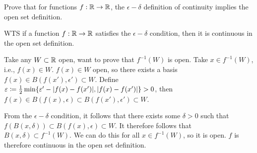 \documentclass[a4paper, 12pt]{article}
\begin{document}
\begin{problem} 
    Prove that for functions $f: \mathbb{R} \to \mathbb{R}$, the $\epsilon - \delta$ definition of continuity implies the open set definition.
\end{problem}
\begin{solution}
    WTS if a function $f: \mathbb{R} \to \mathbb{R}$ satisfies the $\epsilon - \delta$ condition, then it is continuous in the open set definition.

    Take any $W \subset \mathbb{R}$ open, want to prove that $f^{-1}(W)$ is open. Take $x \in f^{-1}(W)$, i.e., $f(x) \in W$. $f(x) \in W$ open, so there exists a basis $f(x) \in B(f(x'), \epsilon') \subset W$. Define $\varepsilon \coloneqq \frac{1}{2} \min\{\varepsilon' - \lvert f(x) - f(x')\rvert, \lvert f(x) - f(x')\rvert\} > 0$, then $f(x) \in B(f(x), \epsilon) \subset B(f(x'), \epsilon') \subset W$.
    
    From the $\epsilon - \delta$ condition, it follows that there exists some $\delta > 0$ such that $f(B(x, \delta)) \subset B(f(x), \epsilon) \subset W$. It therefore follows that $B(x, \delta) \subset f^{-1}(W)$. We can do this for all $x \in f^{-1}(W)$, so it is open. $f$ is therefore continuous in the open set definition.
\end{solution}
\end{document}
